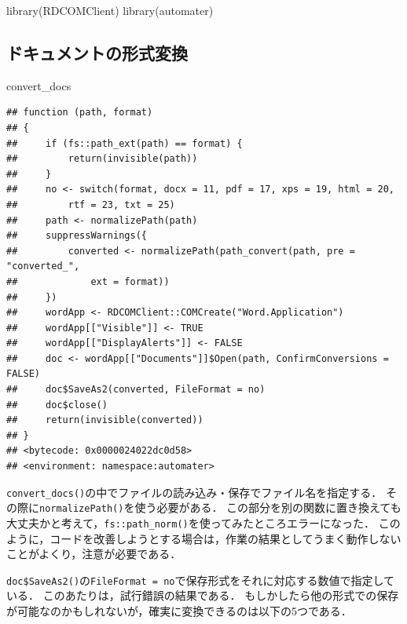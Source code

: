 \documentclass[
]{article}
\newenvironment{Shaded}{\begin{snugshade}}{\end{snugshade}}
\newcommand{\FunctionTok}[1]{\textcolor[rgb]{0.00,0.00,0.00}{#1}}
\newcommand{\NormalTok}[1]{#1}
\begin{document}
\begin{Shaded}
\begin{Highlighting}[]
\FunctionTok{library}\NormalTok{(RDCOMClient)}
\FunctionTok{library}\NormalTok{(automater)}
\end{Highlighting}
\end{Shaded}

\hypertarget{ux30c9ux30adux30e5ux30e1ux30f3ux30c8ux306eux5f62ux5f0fux5909ux63db}{%
\subsection{ドキュメントの形式変換}\label{ux30c9ux30adux30e5ux30e1ux30f3ux30c8ux306eux5f62ux5f0fux5909ux63db}}

\begin{Shaded}
\begin{Highlighting}[]
\NormalTok{convert\_docs}
\end{Highlighting}
\end{Shaded}

\begin{verbatim}
## function (path, format) 
## {
##     if (fs::path_ext(path) == format) {
##         return(invisible(path))
##     }
##     no <- switch(format, docx = 11, pdf = 17, xps = 19, html = 20, 
##         rtf = 23, txt = 25)
##     path <- normalizePath(path)
##     suppressWarnings({
##         converted <- normalizePath(path_convert(path, pre = "converted_", 
##             ext = format))
##     })
##     wordApp <- RDCOMClient::COMCreate("Word.Application")
##     wordApp[["Visible"]] <- TRUE
##     wordApp[["DisplayAlerts"]] <- FALSE
##     doc <- wordApp[["Documents"]]$Open(path, ConfirmConversions = FALSE)
##     doc$SaveAs2(converted, FileFormat = no)
##     doc$close()
##     return(invisible(converted))
## }
## <bytecode: 0x0000024022dc0d58>
## <environment: namespace:automater>
\end{verbatim}

\texttt{convert\_docs()}の中でファイルの読み込み・保存でファイル名を指定する．
その際に\texttt{normalizePath()}を使う必要がある．
この部分を別の関数に置き換えても大丈夫かと考えて，\texttt{fs::path\_norm()}を使ってみたところエラーになった．
このように，コードを改善しようとする場合は，作業の結果としてうまく動作しないことがよくり，注意が必要である．

\texttt{doc\$SaveAs2()}の\texttt{FileFormat\ =\ no}で保存形式をそれに対応する数値で指定している．
このあたりは，試行錯誤の結果である．
もしかしたら他の形式での保存が可能なのかもしれないが，確実に変換できるのは以下の5つである．
\end{document}

